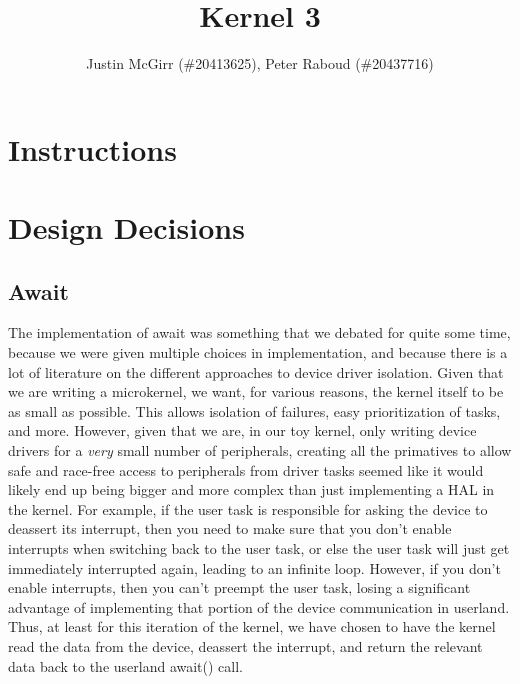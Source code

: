 \documentclass[titlepage]{article}
\begin{document}
\title{Kernel 3}
\author{Justin McGirr (\#20413625), Peter Raboud (\#20437716)}
\maketitle

\section{Instructions}


\section{Design Decisions}
\subsection{Await}
The implementation of await was something that we debated for quite some time,
because we were given multiple choices in implementation, and because there is
a lot of literature on the different approaches to device driver isolation.
Given that we are writing a microkernel, we want, for various reasons, the
kernel itself to be as small as possible. This allows isolation of failures,
easy prioritization of tasks, and more. However, given that we are, in our toy
kernel, only writing device drivers for a \emph{very} small number of
peripherals, creating all the primatives to allow safe and race-free access
to peripherals from driver tasks seemed like it would likely end up being
bigger and more complex than just implementing a HAL in the kernel. For
example, if the user task is responsible for asking the device to deassert
its interrupt, then you need to make sure that you don't enable interrupts
when switching back to the user task, or else the user task will just get
immediately interrupted again, leading to an infinite loop. However, if you
don't enable interrupts, then you can't preempt the user task, losing a
significant advantage of implementing that portion of the device communication
in userland. Thus, at least for this iteration of the kernel, we have chosen
to have the kernel read the data from the device, deassert the interrupt,
and return the relevant data back to the userland await() call.
\end{document}
